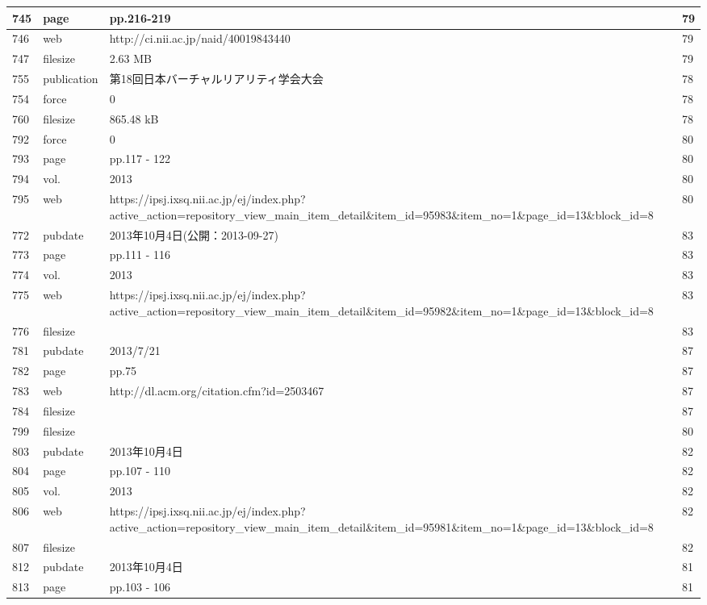 \begin{longtable}{|l|l|l|l|}
745 & page & pp.216-219 & 79 \\ \hline 
746 & web & http://ci.nii.ac.jp/naid/40019843440 & 79 \\ \hline 
747 & filesize & 2.63 MB & 79 \\ \hline 
755 & publication & 第18回日本バーチャルリアリティ学会大会 & 78 \\ \hline 
754 & force & 0 & 78 \\ \hline 
760 & filesize & 865.48 kB & 78 \\ \hline 
792 & force & 0 & 80 \\ \hline 
793 & page & pp.117 - 122
 & 80 \\ \hline 
794 & vol. & 2013 & 80 \\ \hline 
795 & web & https://ipsj.ixsq.nii.ac.jp/ej/index.php?active\_action=repository\_view\_main\_item\_detail\&item\_id=95983\&item\_no=1\&page\_id=13\&block\_id=8 & 80 \\ \hline 
772 & pubdate & 2013年10月4日(公開：2013-09-27) & 83 \\ \hline 
773 & page & pp.111 - 116 & 83 \\ \hline 
774 & vol. & 2013 & 83 \\ \hline 
775 & web & https://ipsj.ixsq.nii.ac.jp/ej/index.php?active\_action=repository\_view\_main\_item\_detail\&item\_id=95982\&item\_no=1\&page\_id=13\&block\_id=8 & 83 \\ \hline 
776 & filesize &  & 83 \\ \hline 
781 & pubdate & 2013/7/21 & 87 \\ \hline 
782 & page & pp.75 & 87 \\ \hline 
783 & web & http://dl.acm.org/citation.cfm?id=2503467 & 87 \\ \hline 
784 & filesize &  & 87 \\ \hline 
799 & filesize &  & 80 \\ \hline 
803 & pubdate & 2013年10月4日 & 82 \\ \hline 
804 & page & pp.107 - 110 & 82 \\ \hline 
805 & vol. & 2013 & 82 \\ \hline 
806 & web & https://ipsj.ixsq.nii.ac.jp/ej/index.php?active\_action=repository\_view\_main\_item\_detail\&item\_id=95981\&item\_no=1\&page\_id=13\&block\_id=8 & 82 \\ \hline 
807 & filesize &  & 82 \\ \hline 
812 & pubdate & 2013年10月4日 & 81 \\ \hline 
813 & page & pp.103 - 106 & 81 \\ \hline 

\end{longtable}
